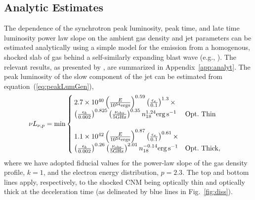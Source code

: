 \documentclass[usenatbib,fleqn]{mnras}
\begin{document}

\subsection{Analytic Estimates}
\label{sec:analyt}

The dependence of the synchrotron peak luminosity, peak time, and late
time luminosity power law slope on the ambient gas density and jet
parameters can be estimated analytically using a simple model for the
emission from a homogenous, shocked slab of gas behind a
self-similarly expanding blast wave (e.g., \citealt{Sari+98,
  Granot+02}).  The relevant results, as presented by
\citet{Leventis+2012}, are summarized in Appendix~\ref{app:analyt}.
The peak luminosity of the slow component of the jet can be estimated
from equation~(\ref{eq:peakLumGen}),
\begin{align}
\nu L_{\nu, p}&=\text{min}
\begin{cases}
  2.7\times 10^{40} \left(\frac{E}{10^{54} {\rm ergs}}\right)^{0.59}
  \left(\frac{\epsilon_e}{0.1}\right)^{1.3}\times \\
  \left(\frac{\epsilon_b}{0.002}\right)^{0.825}\left(\frac{\nu_{\rm
        obs}}{5 {\rm GHz}}\right)^{0.35} n_{18}^{1.24}
  {\rm erg \, s^{-1}} & {\rm Opt.~Thin}\\\\
  1.1 \times 10^{42} \left(\frac{E}{10^{54} {\rm ergs}}\right)^{0.87}
  \left(\frac{\epsilon_e}{0.1}\right)^{0.61}\times\\
  \left(\frac{\epsilon_b}{0.002}\right)^{0.26}\left(\frac{\nu_{\rm
        obs}}{5 {\rm GHz}}\right)^{2.01} n_{18}^{-0.14} {\rm erg\,
    s^{-1}} & {\rm Opt.~Thick},
\end{cases}
\label{eq:peakLum}
\end{align}
where we have adopted fiducial values for the power-law slope of the
gas density profile, $k=1$, and the electron energy distribution,
$p=2.3$.  The top and bottom lines apply, respectively, to the shocked
CNM being optically thin and optically thick at the deceleration time (as delineated by blue lines in Fig.~\ref{fig:diss}).
\end{document}

